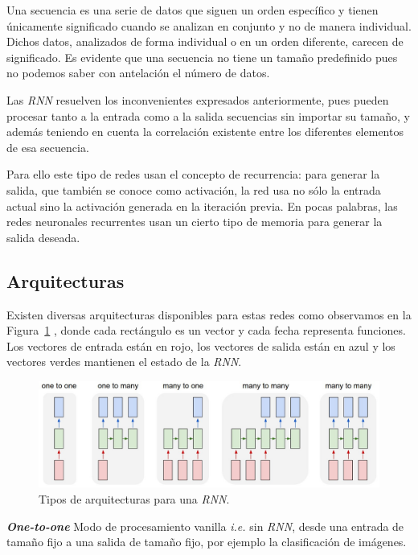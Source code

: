 \documentclass[a4paper,12pt]{article}
\begin{document}
Una secuencia es una serie de datos que siguen un orden específico y tienen únicamente significado cuando se analizan en conjunto y no de manera individual. Dichos datos, analizados de forma individual o en un orden diferente, carecen de significado. Es evidente que una secuencia no tiene un tamaño predefinido pues no podemos saber con antelación el número de datos. 

Las \textit{RNN} resuelven los inconvenientes expresados anteriormente, pues pueden procesar tanto a la entrada como a la salida secuencias sin importar su tamaño, y además teniendo en cuenta la correlación existente entre los diferentes elementos de esa secuencia.

Para ello este tipo de redes usan el concepto de recurrencia: para generar la salida, que también se conoce como activación, la red usa no sólo la entrada actual sino la activación generada en la iteración previa. En pocas palabras, las redes neuronales recurrentes usan un cierto tipo de memoria para generar la salida deseada. 

\subsection{Arquitecturas} \label{rnnarchitecture}
Existen diversas arquitecturas disponibles para estas redes como observamos en la Figura~\ref{fig:rnnarch} \cite{karpathy:rnn}, donde cada rectángulo es un vector y cada fecha representa funciones. Los vectores de entrada están en rojo, los vectores de salida están en azul y los vectores verdes mantienen el estado de la \textit{RNN}.

\begin{figure}[H]
	\begin{center}				
	\includegraphics[width=1\textwidth]{rnnarch.jpg}
  	\caption{Tipos de arquitecturas para una \textit{RNN}.}
  	\label{fig:rnnarch}
  	\end{center}
\end{figure}

\textbf{\textit{One-to-one}}
Modo de procesamiento vanilla \textit{i.e.} sin \textit{RNN}, desde una entrada de tamaño fijo a una salida de tamaño fijo, por ejemplo la clasificación de imágenes.
\end{document}
